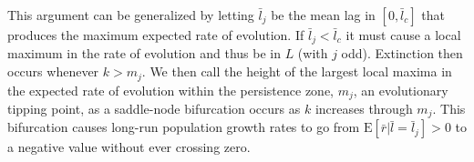 \documentclass[12pt,letterpaper]{article} %
\begin{document}
This argument can be generalized by letting $\bar{l}_j$ be the mean lag in $[0,\bar{l}_c]$ that produces the maximum expected rate of evolution.
If $\bar{l}_j<\bar{l}_c$ it must cause a local maximum in the rate of evolution and thus be in $L$ (with $j$ odd).
Extinction then occurs whenever $k>m_j$.
We then call the height of the largest local maxima in the expected rate of evolution within the persistence zone, $m_j$, an evolutionary tipping point, as a saddle-node bifurcation occurs as $k$ increases through $m_j$.
This bifurcation causes long-run population growth rates to go from $\mathrm{E}[\bar{r}|\bar{l}=\bar{l}_j]>0$ to a negative value without ever crossing zero.  
\end{document}

